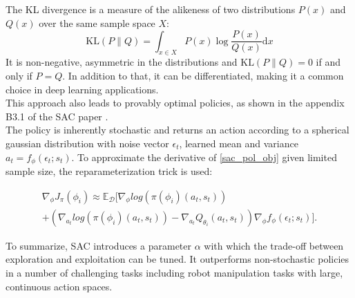 The KL divergence is a measure of the alikeness of two distributions $P(x)$ and $Q(x)$ over the same sample space $X$:
\begin{equation}
    \label{KL}
    \mathrm{KL}(P\|Q) = \int_{x\in X} P(x) \log \frac{P(x)}{Q(x)} \mathrm{d}x
\end{equation}
It is non-negative, asymmetric in the distributions and $\mathrm{KL}(P\|Q) = 0$ if and only if $P = Q$. In addition to that, it can be differentiated, making it 
a common choice in deep learning applications.\\

This approach also leads to provably optimal policies, as shown in the appendix B3.1 of the SAC paper \cite{haarnoja2018soft}. \\
The policy is inherently stochastic and returns an action according to a spherical gaussian distribution with noise vector $\epsilon_t$, learned mean and variance $a_t = f_{\phi}(\epsilon_t;s_t)$. 
To approximate the derivative of \ref{sac_pol_obj} given limited sample size, the reparameterization trick is used:

   
\begin{align}
 \label{SAC_update_rule}
    \nabla_{\phi}J_\pi(\phi_{i}) \approx \mathbb{E}_{\mathcal{D}} [\nabla_{\phi} log (\pi(\phi_{i})(a_t, s_t))\\
    + \left( \nabla_{a_t} log (\pi(\phi_{i})(a_t, s_t)) - \nabla_{a_t} Q_{\theta_i}(a_t, s_t) \right) \nabla_{\phi} f_{\phi}(\epsilon_t;s_t)].
\end{align}



To summarize, SAC introduces a parameter $\alpha$ with which the trade-off between exploration and exploitation can be tuned. It outperforms non-stochastic 
policies in a number of challenging tasks including robot manipulation tasks with large, continuous action spaces.

